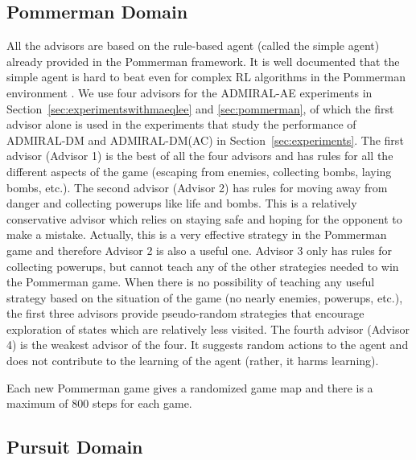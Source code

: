 \documentclass[jair, twoside,11pt,theapa]{article}
\begin{document}
\subsection{Pommerman Domain}



All the advisors are based on the rule-based agent (called the simple agent) already provided in the Pommerman framework. It is well documented that the simple agent is hard to beat even for complex RL algorithms in the Pommerman environment \citep{resnick2018pommerman}. We use four advisors for the ADMIRAL-AE experiments in Section~\ref{sec:experimentswithmaeqlee} and \ref{sec:pommerman}, of which the first advisor alone is used in the experiments that study the performance of ADMIRAL-DM and ADMIRAL-DM(AC) in Section~\ref{sec:experiments}. The first advisor (Advisor 1) is the best of all the four advisors and has rules for all the different aspects of the game (escaping from enemies, collecting bombs, laying bombs, etc.). The second advisor (Advisor 2) has rules for moving away from danger and collecting powerups like life and bombs. This is a relatively conservative advisor which relies on staying safe and hoping for the opponent to make a mistake. Actually, this is a very effective strategy in the Pommerman game and therefore Advisor 2 is also a useful one. Advisor 3 only has rules for collecting powerups, but cannot teach any of the other strategies needed to win the Pommerman game. When there is no possibility of teaching any useful strategy based on the situation of the game (no nearly enemies, powerups, etc.), the first three advisors provide pseudo-random strategies that encourage exploration of states which are relatively less visited. The fourth advisor (Advisor 4) is the weakest advisor of the four. It suggests random actions to the agent and does not contribute to the learning of the agent (rather, it harms learning). 

Each new Pommerman game gives a randomized game map and there is a maximum of 800 steps for each game. 



\subsection{Pursuit Domain} 
\end{document}
